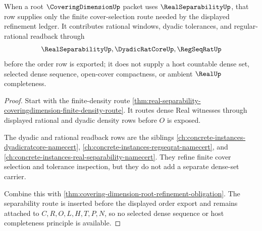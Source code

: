 \begin{theorem}
\label{thm:covering-dimension-root-separability-route}
When a root $\CoveringDimensionUp$ packet uses $\RealSeparabilityUp$, that row supplies only the finite cover-selection route needed by the displayed refinement ledger. It contributes rational windows, dyadic tolerances, and regular-rational readback through
$$
\RealSeparabilityUp,\DyadicRatCoreUp,\RegSeqRatUp
$$
before the order row is exported; it does not supply a host countable dense set, selected dense sequence, open-cover compactness, or ambient $\RealUp$ completeness.
\end{theorem}
\begin{proof}
Start with the finite-density route \autoref{thm:real-separability-coveringdimension-finite-density-route}. It routes dense Real witnesses through displayed rational and dyadic density rows before $O$ is exposed.

The dyadic and rational readback rows are the siblings \autoref{ch:concrete-instances-dyadicratcore-namecert}, \autoref{ch:concrete-instances-regseqrat-namecert}, and \autoref{ch:concrete-instances-real-separability-namecert}. They refine finite cover selection and tolerance inspection, but they do not add a separate dense-set carrier.

Combine this with \autoref{thm:covering-dimension-root-refinement-obligation}. The separability route is inserted before the displayed order export and remains attached to $C,R,O,L,H,T,P,N$, so no selected dense sequence or host completeness principle is available.
\end{proof}

